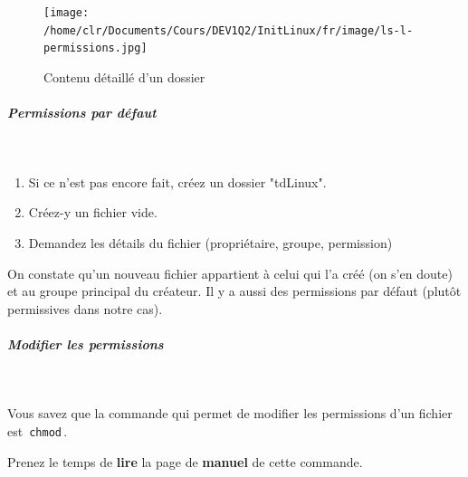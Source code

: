 \documentclass[11pt,a4paper]{article}
\begin{document}
            \par
        \begin{figure}[hbt]
				    \begin{center}
					\texttt{[image: /home/clr/Documents/Cours/DEV1Q2/InitLinux/fr/image/ls-l-permissions.jpg]}
						\end{center}
                
                    \caption[Contenu d\'etaill\'e d'un dossier]{Contenu d\'etaill\'e d'un dossier}
                \end{figure}
                    \clearpage
			
		\subparagraph{Permissions par d\'efaut} 
		
					\textcolor{white}{.} \par
				
            \par
        
					\begin{enumerate}
				
			\item Si ce n'est pas encore fait, cr\'eez un dossier "tdLinux".
			\item Cr\'eez-y un fichier vide.
			\item Demandez les d\'etails du fichier (propri\'etaire, groupe, permission)
					\end{enumerate}
				 
					On constate qu'un nouveau fichier appartient \`a celui qui l'a cr\'e\'e 
					(on s'en doute) et au groupe principal du cr\'eateur. 
					Il y a aussi des permissions par d\'efaut (plut\^ot permissives dans notre cas).  
				
            \par
        
			
		\subparagraph{Modifier les permissions} 
		
					\textcolor{white}{.} \par
				
            \par
          
					Vous savez que la commande qui permet de modifier les permissions d'un fichier est 
					\,\verb|chmod|\,.  
				
            \par
          
					Prenez le temps de \textbf{lire} 
					la page de \textbf{manuel} de cette commande.   
				
            \par
        
\end{document}
